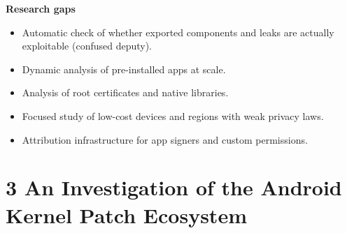 \documentclass[11pt,a4paper]{article}
\begin{document}
\begin{enumerate}
    \vspace{4pt}
    \textbf{Research gaps}
    \begin{itemize}
        \item Automatic check of whether exported components and leaks are actually exploitable (confused deputy).
        \item Dynamic analysis of pre-installed apps at scale.
        \item Analysis of root certificates and native libraries.
        \item Focused study of low-cost devices and regions with weak privacy laws.
        \item Attribution infrastructure for app signers and custom permissions.
    \end{itemize}

\end{enumerate}

\newpage

\section{3 An Investigation of the Android Kernel Patch Ecosystem}
\end{document}
